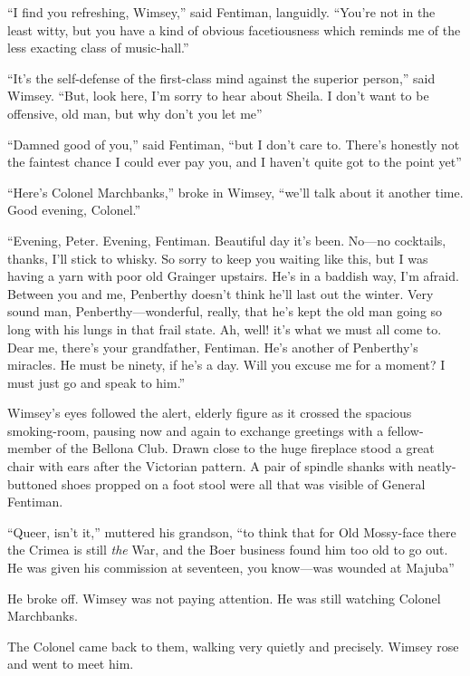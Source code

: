 \enquote{I find you refreshing, Wimsey,} said Fentiman, languidly. \enquote{You're not in the least witty, but you have a kind of obvious facetiousness which reminds me of the less exacting class of music-hall.}

\enquote{It's the self-defense of the first-class mind against the superior person,} said Wimsey. \enquote{But, look here, I'm sorry to hear about Sheila. I don't want to be offensive, old man, but why don't you let me\longdash}

\enquote{Damned good of you,} said Fentiman, \enquote{but I don't care to. There's honestly not the faintest chance I could ever pay you, and I haven't quite got to the point yet\longdash}

\enquote{Here's Colonel Marchbanks,} broke in Wimsey, \enquote{we'll talk about it another time. Good evening, Colonel.}

\enquote{Evening, Peter. Evening, Fentiman. Beautiful day it's been. No\allowbreak---\allowbreak no cocktails, thanks, I'll stick to whisky. So sorry to keep you waiting like this, but I was having a yarn with poor old Grainger upstairs. He's in a baddish way, I'm afraid. Between you and me, Penberthy doesn't think he'll last out the winter. Very sound man, Penberthy\allowbreak---\allowbreak wonderful, really, that he's kept the old man going so long with his lungs in that frail state. Ah, well! it's what we must all come to. Dear me, there's your grandfather, Fentiman. He's another of Penberthy's miracles. He must be ninety, if he's a day. Will you excuse me for a moment? I must just go and speak to him.}

Wimsey's eyes followed the alert, elderly figure as it crossed the spacious smoking-room, pausing now and again to exchange greetings with a fellow-member of the Bellona Club. Drawn close to the huge fireplace stood a great chair with ears after the Victorian pattern. A pair of spindle shanks with neatly-buttoned shoes propped on a foot stool were all that was visible of General Fentiman.

\enquote{Queer, isn't it,} muttered his grandson, \enquote{to think that for Old Mossy-face there the Crimea is still \textit{the} War, and the Boer business found him too old to go out. He was given his commission at seventeen, you know\allowbreak---\allowbreak was wounded at Majuba\longdash}

He broke off. Wimsey was not paying attention. He was still watching Colonel Marchbanks.

The Colonel came back to them, walking very quietly and precisely. Wimsey rose and went to meet him.


